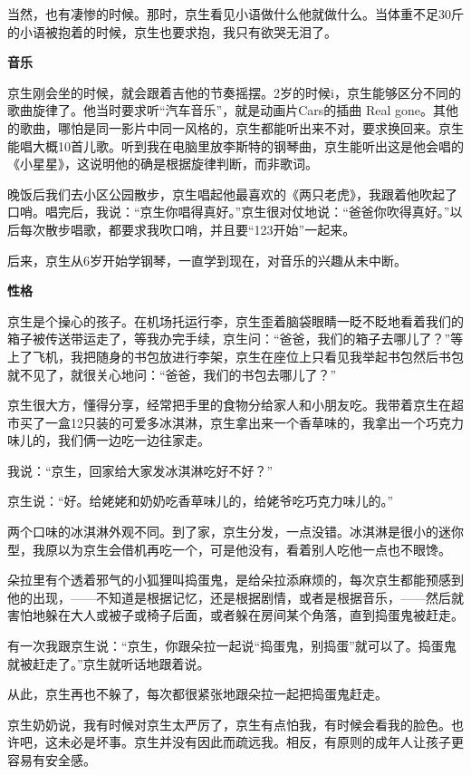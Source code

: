 \documentclass[twoside,openright,headings=optiontohead]{ctexbook} %
\begin{document}
{当然，也有凄惨的时候。那时，京生看见小语做什么他就做什么。当体重不足30斤的小语被抱着的时候，京生也要求抱，我只有欲哭无泪了。

\textbf{音乐}

京生刚会坐的时候，就会跟着吉他的节奏摇摆。2岁的时候i，京生能够区分不同的歌曲旋律了。他当时要求听``汽车音乐''，就是动画片Cars的插曲
Real
gone。其他的歌曲，哪怕是同一影片中同一风格的，京生都能听出来不对，要求换回来。京生能唱大概10首儿歌。听到我在电脑里放李斯特的钢琴曲，京生能听出这是他会唱的《小星星》，这说明他的确是根据旋律判断，而非歌词。

晚饭后我们去小区公园散步，京生唱起他最喜欢的《两只老虎》，我跟着他吹起了口哨。唱完后，我说：``京生你唱得真好。''京生很对仗地说：``爸爸你吹得真好。''以后每次散步唱歌，都要求我吹口哨，并且要``123开始''一起来。

后来，京生从6岁开始学钢琴，一直学到现在，对音乐的兴趣从未中断。

\textbf{性格}

京生是个操心的孩子。在机场托运行李，京生歪着脑袋眼睛一眨不眨地看着我们的箱子被传送带运走了，等我办完手续，京生问：``爸爸，我们的箱子去哪儿了？''等上了飞机，我把随身的书包放进行李架，京生在座位上只看见我举起书包然后书包就不见了，就很关心地问：``爸爸，我们的书包去哪儿了？''

京生很大方，懂得分享，经常把手里的食物分给家人和小朋友吃。我带着京生在超市买了一盒12只装的可爱多冰淇淋，京生拿出来一个香草味的，我拿出一个巧克力味儿的，我们俩一边吃一边往家走。

我说：``京生，回家给大家发冰淇淋吃好不好？''

京生说：``好。给姥姥和奶奶吃香草味儿的，给姥爷吃巧克力味儿的。''

两个口味的冰淇淋外观不同。到了家，京生分发，一点没错。冰淇淋是很小的迷你型，我原以为京生会借机再吃一个，可是他没有，看着别人吃他一点也不眼馋。

朵拉里有个透着邪气的小狐狸叫捣蛋鬼，是给朵拉添麻烦的，每次京生都能预感到他的出现，------不知道是根据记忆，还是根据剧情，或者是根据音乐，------然后就害怕地躲在大人或被子或椅子后面，或者躲在房间某个角落，直到捣蛋鬼被赶走。

有一次我跟京生说：``京生，你跟朵拉一起说``捣蛋鬼，别捣蛋''就可以了。捣蛋鬼就被赶走了。''京生就听话地跟着说。

从此，京生再也不躲了，每次都很紧张地跟朵拉一起把捣蛋鬼赶走。

京生奶奶说，我有时候对京生太严厉了，京生有点怕我，有时候会看我的脸色。也许吧，这未必是坏事。京生并没有因此而疏远我。相反，有原则的成年人让孩子更容易有安全感。

}
\end{document}
